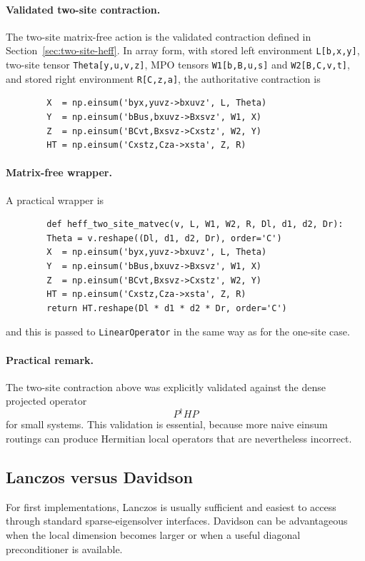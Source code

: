 \documentclass[aps,prb,onecolumn,nofootinbib]{revtex4-2}
\begin{document}
	\paragraph{Validated two-site contraction.}
	The two-site matrix-free action is the validated contraction defined in
	Section~\ref{sec:two-site-heff}. In array form, with stored left environment
	\texttt{L[b,x,y]}, two-site tensor \texttt{Theta[y,u,v,z]}, MPO tensors
	\texttt{W1[b,B,u,s]} and \texttt{W2[B,C,v,t]}, and stored right environment
	\texttt{R[C,z,a]}, the authoritative contraction is
	\begin{verbatim}
		X  = np.einsum('byx,yuvz->bxuvz', L, Theta)
		Y  = np.einsum('bBus,bxuvz->Bxsvz', W1, X)
		Z  = np.einsum('BCvt,Bxsvz->Cxstz', W2, Y)
		HT = np.einsum('Cxstz,Cza->xsta', Z, R)
	\end{verbatim}
	
	\paragraph{Matrix-free wrapper.}
	A practical wrapper is
	\begin{verbatim}
		def heff_two_site_matvec(v, L, W1, W2, R, Dl, d1, d2, Dr):
		Theta = v.reshape((Dl, d1, d2, Dr), order='C')
		X  = np.einsum('byx,yuvz->bxuvz', L, Theta)
		Y  = np.einsum('bBus,bxuvz->Bxsvz', W1, X)
		Z  = np.einsum('BCvt,Bxsvz->Cxstz', W2, Y)
		HT = np.einsum('Cxstz,Cza->xsta', Z, R)
		return HT.reshape(Dl * d1 * d2 * Dr, order='C')
	\end{verbatim}
	and this is passed to \texttt{LinearOperator} in the same way as for the one-site case.
	
	\paragraph{Practical remark.}
	The two-site contraction above was explicitly validated against the dense projected operator
	\[
	P^\dagger H P
	\]
	for small systems. This validation is essential, because more naive einsum routings can
	produce Hermitian local operators that are nevertheless incorrect.
	
	\subsection{Lanczos versus Davidson}
	
	For first implementations, Lanczos is usually sufficient and easiest to access through
	standard sparse-eigensolver interfaces. Davidson can be advantageous when the local
	dimension becomes larger or when a useful diagonal preconditioner is available.
	
\end{document}
